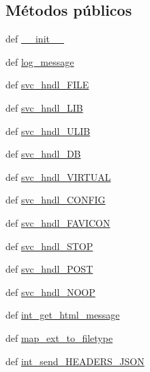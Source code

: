 \subsection*{Métodos públicos}
\begin{DoxyCompactItemize}
\item 
def \hyperlink{class_proxy_1_1_proxy_ac2ac55dfff6cbcfcac643e7e3129e2da}{\-\_\-\-\_\-init\-\_\-\-\_\-}
\item 
def \hyperlink{class_proxy_1_1_proxy_a9db6864eab9f2006368fe909847d83bc}{log\-\_\-message}
\item 
def \hyperlink{class_proxy_1_1_proxy_ab39c82e0930ce514c746b5e0ec01c94e}{svc\-\_\-hndl\-\_\-\-F\-I\-L\-E}
\item 
def \hyperlink{class_proxy_1_1_proxy_a3d5391352ca830a079824ec9af61a0c9}{svc\-\_\-hndl\-\_\-\-L\-I\-B}
\item 
def \hyperlink{class_proxy_1_1_proxy_aad2d321a995641e7fecc7cfe9cd7a0f9}{svc\-\_\-hndl\-\_\-\-U\-L\-I\-B}
\item 
def \hyperlink{class_proxy_1_1_proxy_af21544c49ea3bd10fbe5e2df39ea0bfa}{svc\-\_\-hndl\-\_\-\-D\-B}
\item 
def \hyperlink{class_proxy_1_1_proxy_a722a6a583213ef2b5ed1f9b351a98ff0}{svc\-\_\-hndl\-\_\-\-V\-I\-R\-T\-U\-A\-L}
\item 
def \hyperlink{class_proxy_1_1_proxy_a1237202957a6b08d9b7af77df5f282e2}{svc\-\_\-hndl\-\_\-\-C\-O\-N\-F\-I\-G}
\item 
def \hyperlink{class_proxy_1_1_proxy_a00c77e59bfbd6f31df38461de9d3b86e}{svc\-\_\-hndl\-\_\-\-F\-A\-V\-I\-C\-O\-N}
\item 
def \hyperlink{class_proxy_1_1_proxy_a903eb309eb48270d1a81c4aafbdcd66b}{svc\-\_\-hndl\-\_\-\-S\-T\-O\-P}
\item 
def \hyperlink{class_proxy_1_1_proxy_afd2a93e40151bb893e17a161b3a9a592}{svc\-\_\-hndl\-\_\-\-P\-O\-S\-T}
\item 
def \hyperlink{class_proxy_1_1_proxy_a8197ed85f0e852510889d7b0027d18b0}{svc\-\_\-hndl\-\_\-\-N\-O\-O\-P}
\item 
def \hyperlink{class_proxy_1_1_proxy_ad86f15414a1c7ec360023c0100eb2b27}{int\-\_\-get\-\_\-html\-\_\-message}
\item 
def \hyperlink{class_proxy_1_1_proxy_a393429624d1944463a47b63c079f4722}{map\-\_\-ext\-\_\-to\-\_\-filetype}
\item 
def \hyperlink{class_proxy_1_1_proxy_a79f93e001c37ae2bbb63cfa14e5bb4d2}{int\-\_\-send\-\_\-\-H\-E\-A\-D\-E\-R\-S\-\_\-\-J\-S\-O\-N}
\item 

\end{DoxyCompactItemize}
